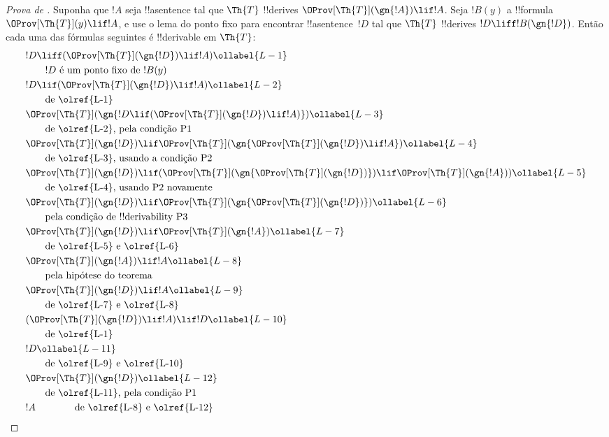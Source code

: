 \documentclass[../../../include/open-logic-section]{subfiles}
\begin{document}
\begin{proof}[Prova de ]
Suponha que $!A$ seja !!a{sentence} tal que $\Th{T}$ !!{derive}s
$\OProv[\Th{T}](\gn{!A}) \lif !A$. Seja $!B(y)$ a
!!{formula}~$\OProv[\Th{T}](y) \lif !A$, e use o lema do ponto fixo para
encontrar !!a{sentence}~$!D$ tal que $\Th{T}$ !!{derive}s
$!D \liff !B(\gn{!D})$. Então cada uma das fórmulas seguintes é
!!{derivable} em $\Th{T}$:
\begin{align}
  & !D \liff (\OProv[\Th{T}](\gn{!D}) \lif !A) \ollabel{L-1}\\
  & \qquad \text{$!D$ é um ponto fixo de~$!B(y)$}\notag \\
  & !D \lif (\OProv[\Th{T}](\gn{!D}) \lif !A) \ollabel{L-2}\\
  & \qquad\text{de \olref{L-1}}\notag\\
  & \OProv[\Th{T}](\gn{!D \lif (\OProv[\Th{T}](\gn{!D}) \lif !A)}) \ollabel{L-3}\\
  & \qquad \text{de \olref{L-2}, pela condição P1}\notag \\
  & \OProv[\Th{T}](\gn{!D}) \lif \OProv[\Th{T}](\gn{\OProv[\Th{T}](\gn{!D}) \lif !A})
  \ollabel{L-4}\\
  &\qquad \text{de \olref{L-3}, usando a condição P2}\notag \\
  & \OProv[\Th{T}](\gn{!D}) \lif (\OProv[\Th{T}](\gn{\OProv[\Th{T}](\gn{!D})}) \lif \OProv[\Th{T}](\gn{!A})) \ollabel{L-5}\\
  &\qquad \text{de \olref{L-4}, usando P2 novamente} \notag\\
& \OProv[\Th{T}](\gn{!D}) \lif \OProv[\Th{T}](\gn{\OProv[\Th{T}](\gn{!D})}) \ollabel{L-6}\\
  & \qquad\text{pela condição de !!{derivability} P3} \notag\\
  & \OProv[\Th{T}](\gn{!D}) \lif \OProv[\Th{T}](\gn{!A}) \ollabel{L-7} \\
  &\qquad\text{de \olref{L-5} e \olref{L-6}}\notag\\
  & \OProv[\Th{T}](\gn{!A}) \lif !A \ollabel{L-8}\\
  &\qquad\text{pela hipótese do teorema} \notag\\
  & \OProv[\Th{T}](\gn{!D}) \lif !A \ollabel{L-9}\\
  &\qquad\text{de \olref{L-7} e \olref{L-8}}\notag\\
  & (\OProv[\Th{T}](\gn{!D}) \lif !A) \lif !D \ollabel{L-10}\\
  & \qquad \text{de \olref{L-1}}\notag \\
  & !D \ollabel{L-11}\\
  & \qquad\text{de \olref{L-9} e \olref{L-10}}\notag \\
  & \OProv[\Th{T}](\gn{!D}) \ollabel{L-12}\\
  & \qquad\text{de \olref{L-11}, pela condição~P1}\notag \\
  & !A \qquad\qquad\text{de \olref{L-8} e \olref{L-12}}\notag
\end{align}
\end{proof}
\end{document}
